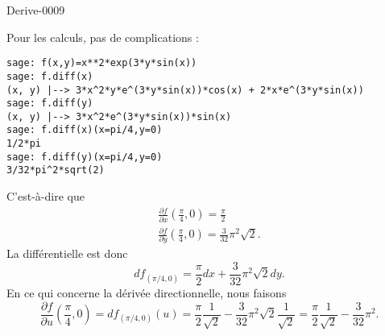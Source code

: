 
\begin{corrige}{Derive-0009}

    Pour les calculs, pas de complications :
    \begin{verbatim}
sage: f(x,y)=x**2*exp(3*y*sin(x))
sage: f.diff(x)            
(x, y) |--> 3*x^2*y*e^(3*y*sin(x))*cos(x) + 2*x*e^(3*y*sin(x))
sage: f.diff(y)
(x, y) |--> 3*x^2*e^(3*y*sin(x))*sin(x)
sage: f.diff(x)(x=pi/4,y=0)
1/2*pi
sage: f.diff(y)(x=pi/4,y=0)
3/32*pi^2*sqrt(2)
    \end{verbatim}
    C'est-à-dire que
    \begin{subequations}
        \begin{align}
            \frac{ \partial f }{ \partial x }(\frac{ \pi }{ 4 },0)=\frac{ \pi }{ 2 }\\
            \frac{ \partial f }{ \partial y } (\frac{ \pi }{ 4 },0)=\frac{ 3 }{ 32 }\pi^2\sqrt{2}.
        \end{align}
    \end{subequations}
    La différentielle est donc
    \begin{equation}
        df_{(\pi/4,0)}=\frac{ \pi }{ 2 }dx+\frac{ 3 }{ 32 }\pi^2\sqrt{2}dy.
    \end{equation}
    En ce qui concerne la dérivée directionnelle, nous faisons
    \begin{equation}
        \frac{ \partial f }{ \partial u }(\frac{ \pi }{ 4 },0)=df_{(\pi/4,0)}(u)=\frac{ \pi }{2}\frac{1}{ \sqrt{2} }-\frac{ 3 }{ 32 }\pi^2\sqrt{2}\frac{1}{ \sqrt{2} }=\frac{ \pi }{2}\frac{1}{ \sqrt{2} }-\frac{ 3 }{ 32 }\pi^2.
    \end{equation}
\end{corrige}
